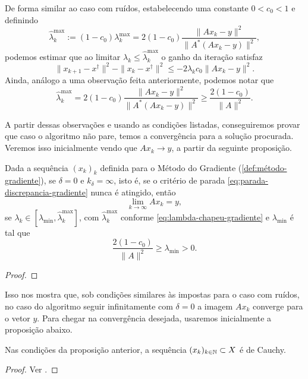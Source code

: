 De forma similar ao caso com ruídos, estabelecendo uma constante $0<c_0<1$ e definindo
\begin{equation}\label{eq:lambda-chapeu-gradiente}
    \hat \lambda_k^{\max} := (1-c_0)\lambda_k^{\max} = 2(1-c_0)\frac{ \| Ax_k - y\|^2}{\|A^*(Ax_k - y)\|^2},
\end{equation}
podemos estimar que ao limitar $\lambda_k \leq \hat \lambda_k^{\max}$ o ganho da iteração satisfaz
\begin{equation}\label{eq:ganho-gradiente}
    \|x_{k+1} - x^\dag\|^2-\| x_k - x^\dag\|^2 \leq -2\lambda_kc_0\|Ax_k-y \|^2.
\end{equation}
Ainda, análogo a uma observação feita anteriormente, podemos notar que
\[
\hat \lambda_k^{\max} = 2(1-c_0)\frac{ \| Ax_k - y\|^2}{\|A^*(Ax_k - y)\|^2} \geq \frac{2(1-c_0)}{\|A\|^2}.
\]

A partir dessas observações e usando as condições listadas, conseguiremos provar que caso o algoritmo não pare, temos a convergência para a solução procurada. Veremos isso inicialmente vendo que $Ax_k \to y$, a partir da seguinte proposição.

\begin{prop}\label{prop:convergencia-residuo-grandiente}
    Dada a sequência $(x_k)_k$ definida para o Método do Gradiente (\ref{def:método-gradiente}), se $\delta=0$ e $k_\delta=\infty$, isto é, se o critério de parada \eqref{eq:parada-discrepancia-gradiente} nunca é atingido, então
    \[
        \lim_{k\to \infty} Ax_k = y,
    \]
    se $\lambda_k \in [\lambda_{\min},\hat \lambda_k^{\max}]$, com $\hat\lambda_k^{\max}$ conforme \eqref{eq:lambda-chapeu-gradiente} e $\lambda_{\min}$ é tal que
    \[
        \frac{2(1-c_0)}{\|A\|^2} \geq \lambda_{\min} >0.
    \]
\end{prop}
\begin{proof}
\end{proof}

Isso nos mostra que, sob condições similares às impostas para o caso com ruídos, no caso do algoritmo seguir infinitamente com $\delta=0$ a imagem $Ax_k$ converge para o vetor $y$. Para chegar na convergência desejada, usaremos inicialmente a proposição abaixo.

\begin{prop}
    Nas condições da proposição anterior, a sequência $(x_k)_{k\in \mathbb N} \subset X$ é de Cauchy.
\end{prop}
\begin{proof}
    Ver \cite{??}.
\end{proof}

